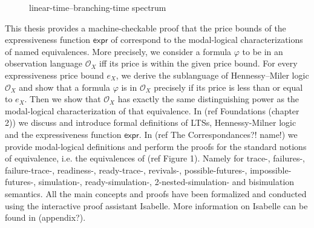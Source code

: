 \begin{isabellebody}
\begin{isamarkuptext}
\begin{figure}[htbp]
\caption{linear-time--branching-time spectrum}
    \label{fig:1_1}
\end{figure}%
\end{isamarkuptext}\isamarkuptrue%
%
\isadelimdocument
%
\endisadelimdocument
%
\isatagdocument
%
\isamarkuptrue%
%
\endisatagdocument
{\isafolddocument}%
%
\isadelimdocument
%
\endisadelimdocument
%
\begin{isamarkuptext}%
This thesis provides a machine-checkable proof that the price bounds of the expressiveness function $\textsf{expr}$ of \cite{bisping2023process} correspond to the modal-logical characterizations of named equivalences. 
More precisely, we consider a formula $\varphi$ to be in an observation language $\mathcal{O}_X$ iff its price is within the given price bound.
For every expressiveness price bound $e_X$, we derive the sublanguage of Hennessy--Miler logic $\mathcal{O}_X$ and show that a formula $\varphi$ is in $\mathcal{O}_X$ precisely if its price  is less than or equal to $e_X$.
Then we show that $\mathcal{O}_X$ has exactly the same distinguishing power as the modal-logical characterization of that equivalence.
In (ref Foundations (chapter 2)) we discuss and introduce formal definitions of LTSs, Hennessy-Milner logic and the expressiveness function $\textsf{expr}$. In (ref The Correspondances?! name!) we provide modal-logical definitions and perform
the proofs for the standard notions of equivalence, i.e. the equivalences of (ref Figure 1). Namely for trace-, failures-, failure-trace-, readiness-, ready-trace-, revivals-, possible-futures-, impossible-futures-, simulation-, ready-simulation-, 2-nested-simulation- and bisimulation semantics.
All the main concepts and proofs have been formalized and conducted using the interactive proof assistant Isabelle. More information on Isabelle can be found in (appendix?).

\end{isamarkuptext}
\end{isabellebody}
